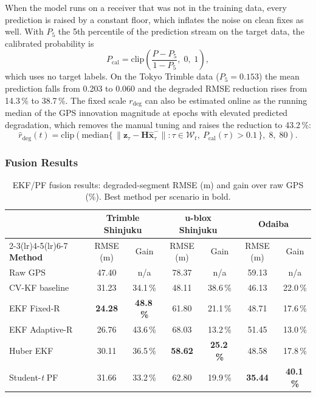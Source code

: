 \documentclass[12pt,a4paper]{article}
\begin{document}
When the model runs on a receiver that was not in the training data, every prediction is
raised by a constant floor, which inflates the noise on clean fixes as well. With $P_5$ the
5th percentile of the prediction stream on the target data, the calibrated probability is
\begin{equation}\label{eq:floorcal}
  P_\mathrm{cal} = \mathrm{clip}\!\left(\frac{P - P_5}{1 - P_5},\; 0,\; 1\right),
\end{equation}
which uses no target labels. On the Tokyo Trimble data ($P_5 = 0.153$) the mean prediction
falls from 0.203 to 0.060 and the degraded RMSE reduction rises from 14.3\,\% to 38.7\,\%.
The fixed scale $r_\mathrm{deg}$ can also be estimated online as the running median of the
GPS innovation magnitude at epochs with elevated predicted degradation, which removes the
manual tuning and raises the reduction to 43.2\,\%:
\begin{equation}\label{eq:onlinesigma}
  \hat{r}_\mathrm{deg}(t) = \mathrm{clip}\!\left(
    \mathrm{median}\{\,\lVert\mathbf{z}_\tau - \mathbf{H}\hat{\mathbf{x}}_\tau^-\rVert :
    \tau \in \mathcal{W}_t,\ P_\mathrm{cal}(\tau) > 0.1 \,\},\; 8,\; 80\right).
\end{equation}

\subsubsection{Fusion Results}

\begin{table}[H]
  \centering
  \caption{EKF/PF fusion results: degraded-segment RMSE (m) and gain over raw GPS (\%).
           Best method per scenario in bold.}
  \label{tab:fusion}
  \begin{tabular}{lcccccc}
    \toprule
    & \multicolumn{2}{c}{\textbf{Trimble Shinjuku}} &
      \multicolumn{2}{c}{\textbf{u-blox Shinjuku}} &
      \multicolumn{2}{c}{\textbf{Odaiba}} \\
    \cmidrule(lr){2-3}\cmidrule(lr){4-5}\cmidrule(lr){6-7}
    \textbf{Method} & RMSE (m) & Gain & RMSE (m) & Gain & RMSE (m) & Gain \\
    \midrule
    Raw GPS         & 47.40 & n/a      & 78.37 & n/a      & 59.13 & n/a \\
    CV-KF baseline  & 31.23 & 34.1\,\% & 48.11 & 38.6\,\% & 46.13 & 22.0\,\% \\
    EKF Fixed-R     & \textbf{24.28} & \textbf{48.8\,\%} & 61.80 & 21.1\,\% & 48.71 & 17.6\,\% \\
    EKF Adaptive-R  & 26.76 & 43.6\,\% & 68.03 & 13.2\,\% & 51.45 & 13.0\,\% \\
    Huber EKF       & 30.11 & 36.5\,\% & \textbf{58.62} & \textbf{25.2\,\%} & 48.58 & 17.8\,\% \\
    Student-\emph{t} PF & 31.66 & 33.2\,\% & 62.80 & 19.9\,\% & \textbf{35.44} & \textbf{40.1\,\%} \\
    \bottomrule
  \end{tabular}
\end{table}
\end{document}
